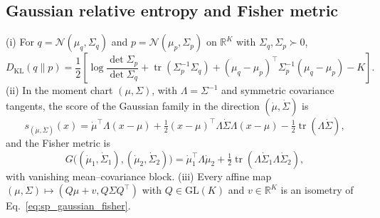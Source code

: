 \subsection{Gaussian relative entropy and Fisher metric}\label{app:sp_gaussian}

\begin{proposition}\label{prop:sp_gaussian}
(i) For $q=\mathcal N(\mu_q,\Sigma_q)$ and $p=\mathcal N(\mu_p,\Sigma_p)$ on $\mathbb R^K$ with $\Sigma_q,\Sigma_p\succ0$,
\begin{equation}
D_{\mathrm{KL}}(q\|p)=\frac12\left[\log\frac{\det\Sigma_p}{\det\Sigma_q}+\operatorname{tr}(\Sigma_p^{-1}\Sigma_q)+(\mu_q-\mu_p)^\top\Sigma_p^{-1}(\mu_q-\mu_p)-K\right].
\label{eq:sp_gaussian_kl}
\end{equation}
(ii) In the moment chart $(\mu,\Sigma)$, with $\Lambda=\Sigma^{-1}$ and symmetric covariance tangents, the score of the Gaussian family in the direction $(\dot\mu,\dot\Sigma)$ is
\begin{equation}
s_{(\dot\mu,\dot\Sigma)}(x)=\dot\mu^\top\Lambda(x-\mu)+\tfrac12(x-\mu)^\top\Lambda\dot\Sigma\Lambda(x-\mu)-\tfrac12\operatorname{tr}(\Lambda\dot\Sigma),
\label{eq:sp_gaussian_score}
\end{equation}
and the Fisher metric is
\begin{equation}
G\big((\dot\mu_1,\dot\Sigma_1),(\dot\mu_2,\dot\Sigma_2)\big)=\dot\mu_1^\top\Lambda\dot\mu_2+\tfrac12\operatorname{tr}(\Lambda\dot\Sigma_1\Lambda\dot\Sigma_2),
\label{eq:sp_gaussian_fisher}
\end{equation}
with vanishing mean--covariance block.
(iii) Every affine map $(\mu,\Sigma)\mapsto(Q\mu+v,Q\Sigma Q^\top)$ with $Q\in\mathrm{GL}(K)$ and $v\in\mathbb R^K$ is an isometry of Eq.~\eqref{eq:sp_gaussian_fisher}.
\end{proposition}
